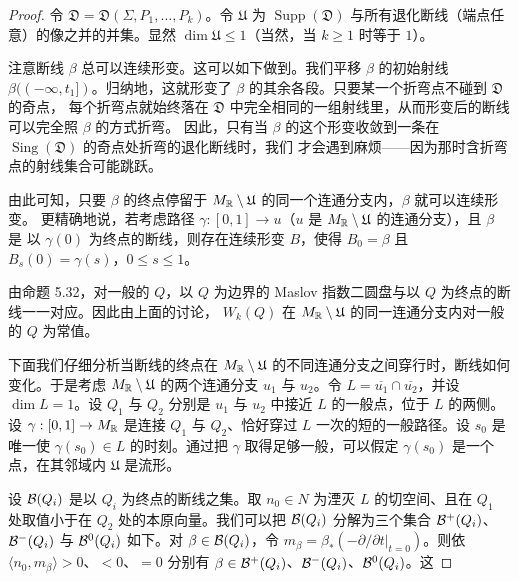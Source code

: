 \begin{proof}
令 $\mathfrak D = \mathfrak D(\Sigma,P_1,\dots,P_k)$。令 $\mathfrak U$ 为 $\operatorname{Supp}(\mathfrak D)$ 与所有退化断线（端点任意）的像之并的并集。显然 $\dim\mathfrak U\le1$（当然，当 $k\ge1$ 时等于 $1$）。

注意断线 $\beta$ 总可以连续形变。这可以如下做到。我们平移 $\beta$ 的初始射线
$\beta((-\infty,t_1])$。归纳地，这就形变了 $\beta$ 的其余各段。只要某一个折弯点不碰到 $\mathfrak D$ 的奇点，
每个折弯点就始终落在 $\mathfrak D$ 中完全相同的一组射线里，从而形变后的断线可以完全照 $\beta$ 的方式折弯。
因此，只有当 $\beta$ 的这个形变收敛到一条在 $\operatorname{Sing}(\mathfrak D)$ 的奇点处折弯的退化断线时，我们
才会遇到麻烦——因为那时含折弯点的射线集合可能跳跃。

由此可知，只要 $\beta$ 的终点停留于 $M_{\mathbb{R}}\setminus\mathfrak U$ 的同一个连通分支内，$\beta$ 就可以连续形变。
更精确地说，若考虑路径 $\gamma : [0,1]\to u$（$u$ 是 $M_{\mathbb{R}}\setminus\mathfrak U$ 的连通分支），且 $\beta$ 是
以 $\gamma(0)$ 为终点的断线，则存在连续形变 $B$，使得 $B_0 = \beta$ 且 $B_s(0) = \gamma(s)$，$0\le s\le1$。

由命题 5.32，对一般的 $Q$，以 $Q$ 为边界的 Maslov 指数二圆盘与以 $Q$ 为终点的断线一一对应。因此由上面的讨论，
$W_k(Q)$ 在 $M_{\mathbb{R}}\setminus\mathfrak U$ 的同一连通分支内对一般的 $Q$ 为常值。

下面我们仔细分析当断线的终点在 $M_{\mathbb{R}}\setminus\mathfrak U$ 的不同连通分支之间穿行时，断线如何变化。于是考虑
$M_{\mathbb{R}}\setminus\mathfrak U$ 的两个连通分支 $u_1$ 与 $u_2$。令 $L = \overline{u_1}\cap\overline{u_2}$，并设
$\dim L = 1$。设 $Q_1$ 与 $Q_2$ 分别是 $u_1$ 与 $u_2$ 中接近 $L$ 的一般点，位于 $L$ 的两侧。设
$\gamma : [0,1]\to M_{\mathbb{R}}$ 是连接 $Q_1$ 与 $Q_2$、恰好穿过 $L$ 一次的短的一般路径。设 $s_0$ 是唯一使
$\gamma(s_0)\in L$ 的时刻。通过把 $\gamma$ 取得足够一般，可以假定 $\gamma(s_0)$ 是一个点，在其邻域内
$\mathfrak U$ 是流形。

设 $\mathcal{B}(Q_i)$ 是以 $Q_i$ 为终点的断线之集。取 $n_0\in N$ 为湮灭 $L$ 的切空间、且在 $Q_1$ 处取值小于在 $Q_2$
处的本原向量。我们可以把 $\mathcal{B}(Q_i)$ 分解为三个集合 $\mathcal{B}^+(Q_i)$、$\mathcal{B}^-(Q_i)$ 与 $\mathcal{B}^0(Q_i)$ 如下。对
$\beta\in\mathcal{B}(Q_i)$，令 $m_\beta = \beta_*(-\partial/\partial t|_{t=0})$。则依
$\langle n_0,m_\beta\rangle>0$、$<0$、$=0$ 分别有 $\beta\in\mathcal{B}^+(Q_i)$、$\mathcal{B}^-(Q_i)$、$\mathcal{B}^0(Q_i)$。这


\end{proof}
